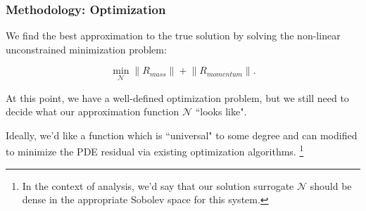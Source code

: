 \begin{frame}
    \frametitle{Methodology: Optimization}

    We find the best approximation to the true solution by solving the non-linear unconstrained minimization problem:

    $$
    \min_{\mathcal{N}} {\lVert R_{mass} \rVert + \lVert R_{momentum} \rVert}.
    $$

    \bigskip
    \pause

    At this point, we have a well-defined optimization problem, but we still need to decide what our approximation 
    function $\mathcal{N}$ ``looks like". 

    \bigskip
    \pause

    Ideally, we'd like a function which is ``universal" to some degree and can modified to minimize the PDE residual via 
    existing optimization algorithms. \only<+->\footnote{
        In the context of analysis, we'd say that our solution surrogate $\mathcal{N}$ should be dense in the 
        appropriate Sobolev space for this system.
    }
\end{frame}